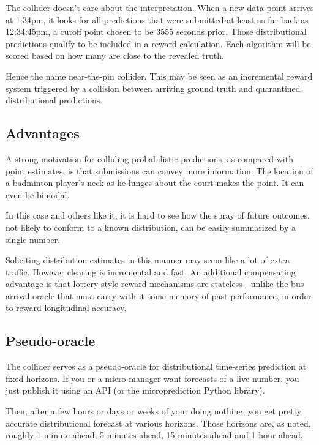 The collider doesn't care about the interpretation. When a new data point arrives at 1:34pm, it looks for all predictions that were submitted at least as far back as 12:34:45pm, a cutoff point chosen to be 3555 seconds prior. Those distributional predictions qualify to be included in a reward calculation. Each algorithm will be scored based on how many are close to the revealed truth. 

Hence the name near-the-pin collider. This may be seen as an incremental reward system triggered by a collision between arriving ground truth and quarantined distributional predictions. 

\subsection{Advantages}

A strong motivation for colliding probabilistic predictions, as compared with point estimates, is that submissions can convey more information. The location of a badminton player's neck as he lunges about the court makes the point. It can even be bimodal. 

In this case and others like it, it is hard to see how the spray of future outcomes, not likely to conform to a known distribution, can be easily summarized by a single number.

Soliciting distribution estimates in this manner may seem like a lot of extra traffic. However clearing is incremental and fast. An additional compensating advantage is that lottery style reward mechanisms are stateless - unlike the bus arrival oracle that must carry with it some memory of past performance, in order to reward longitudinal accuracy. 


\subsection{Pseudo-oracle}

The collider serves as a pseudo-oracle for distributional time-series prediction at fixed horizons. If you or a micro-manager want forecasts of a live number, you just publish it using an API (or the microprediction Python library). 

Then, after a few hours or days or weeks of your doing nothing, you get pretty accurate distributional forecast at various horizons. Those horizons are, as noted, roughly 1 minute ahead, 5 minutes ahead, 15 minutes ahead and 1 hour ahead. 

